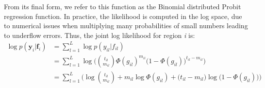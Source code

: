 From its final form, we refer to this function as the Binomial distributed Probit regression function. In practice, the likelihood is computed in the log space, due to numerical issues when multiplying many probabilities of small numbers leading to underflow errors. Thus, the joint log likelihood for region \emph{i} is:
\begin{equation} \label{likel-binom-prob-log-f}
  \begin{split}
	\log p(\mathbf{y}_{i}|\mathbf{f}_{i}) & = \sum_{l=1}^{L} \log p(y_{il}|f_{il}) \\
				& = \sum_{l=1}^{L} \log \bigg(\binom{t_{il}}{m_{il}} \Phi(g_{il})^{m_{il}} \big(1 - \Phi(g_{il})\big)^{t_{il} - m_{il}}\bigg) \\
				& = \sum_{l=1}^{L} \bigg(\log \binom{t_{il}}{m_{il}} + m_{il} \log \Phi(g_{il}) + \big(t_{il} - m_{il} \big) \log \big(1 - \Phi(g_{il})\big)\bigg)
  \end{split}
\end{equation}